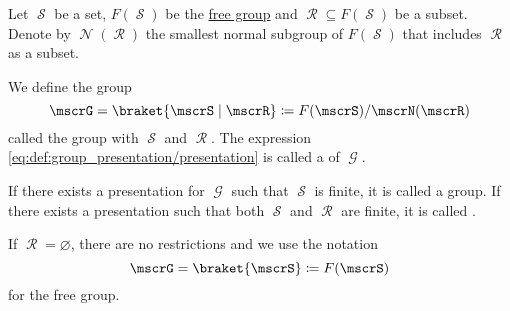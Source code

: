 \begin{definition}\label{def:group_presentation}
  Let \( \mscrS \) be a set, \( F(\mscrS) \) be the \hyperref[def:free_group]{free group} and \( \mscrR \subseteq F(\mscrS) \) be a subset. Denote by \( \mscrN(\mscrR) \) the smallest normal subgroup of \( F(\mscrS) \) that includes \( \mscrR \) as a subset.

  We define the group
  \begin{equation}\label{eq:def:group_presentation/presentation}
    \mscrG = \braket{ \mscrS \mid \mscrR} \coloneqq F(\mscrS) / \mscrN(\mscrR)
  \end{equation}
  called the group with  \( \mscrS \) and  \( \mscrR \). The expression \eqref{eq:def:group_presentation/presentation} is called a  of \( \mscrG \).

  If there exists a presentation for \( \mscrG \) such that \( \mscrS \) is finite, it is called a  group. If there exists a presentation such that both \( \mscrS \) and \( \mscrR \) are finite, it is called .

  If \( \mscrR = \varnothing \), there are no restrictions and we use the notation
  \begin{equation}\label{eq:def:group_presentation/free}
    \mscrG = \braket{ \mscrS } \coloneqq F(\mscrS)
  \end{equation}
  for the free group.
\end{definition}

